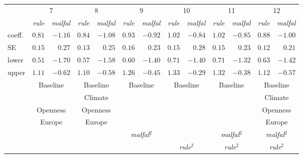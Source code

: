  \begin{tabular}{lrrrrrrrrrrrr}
\hline \hline 
& \multicolumn{2}{c}{7} & \multicolumn{2}{c}{8} & \multicolumn{2}{c}{9} & \multicolumn{2}{c}{10} & \multicolumn{2}{c}{11} & \multicolumn{2}{c}{12}\\ 
& \multicolumn{1}{c}{\emph{rule}} & \multicolumn{1}{c}{\emph{malfal}} & \multicolumn{1}{c}{\emph{rule}} & \multicolumn{1}{c}{\emph{malfal}} & \multicolumn{1}{c}{\emph{rule}} & \multicolumn{1}{c}{\emph{malfal}} & \multicolumn{1}{c}{\emph{rule}} & \multicolumn{1}{c}{\emph{malfal}} & \multicolumn{1}{c}{\emph{rule}} & \multicolumn{1}{c}{\emph{malfal}} & \multicolumn{1}{c}{\emph{rule}} & \multicolumn{1}{c}{\emph{malfal}}\\ 
 \hline 
 
coeff. & $0.81$ & $-1.16$ & $0.84$ & $-1.08$ & $0.93$ & $-0.92$ & $1.02$ & $-0.84$ & $1.02$ & $-0.85$ & $0.88$ & $-1.00$\\ 
SE & $0.15$ & $0.27$ & $0.13$ & $0.25$ & $0.16$ & $0.23$ & $0.15$ & $0.28$ & $0.15$ & $0.23$ & $0.12$ & $0.21$\\ 
lower & $0.51$ & $-1.70$ & $0.57$ & $-1.58$ & $0.60$ & $-1.40$ & $0.71$ & $-1.40$ & $0.71$ & $-1.32$ & $0.63$ & $-1.42$\\ 
upper & $1.11$ & $-0.62$ & $1.10$ & $-0.58$ & $1.26$ & $-0.45$ & $1.33$ & $-0.29$ & $1.32$ & $-0.38$ & $1.12$ & $-0.57$\\ 
& \multicolumn{2}{c}{Baseline} & \multicolumn{2}{c}{Baseline} & \multicolumn{2}{c}{Baseline} & \multicolumn{2}{c}{Baseline} & \multicolumn{2}{c}{Baseline} & \multicolumn{2}{c}{Baseline}\\ 
& \multicolumn{2}{c}{} & \multicolumn{2}{c}{Climate} & \multicolumn{2}{c}{} & \multicolumn{2}{c}{} & \multicolumn{2}{c}{} & \multicolumn{2}{c}{Climate}\\ 
& \multicolumn{2}{c}{Openness} & \multicolumn{2}{c}{Openness} & \multicolumn{2}{c}{} & \multicolumn{2}{c}{} & \multicolumn{2}{c}{} & \multicolumn{2}{c}{Openness}\\ 
& \multicolumn{2}{c}{Europe} & \multicolumn{2}{c}{Europe} & \multicolumn{2}{c}{} & \multicolumn{2}{c}{} & \multicolumn{2}{c}{} & \multicolumn{2}{c}{Europe}\\ 
& \multicolumn{2}{c}{} & \multicolumn{2}{c}{} & \multicolumn{2}{c}{\emph{malfal}$^2$} & \multicolumn{2}{c}{} & \multicolumn{2}{c}{\emph{malfal}$^2$} & \multicolumn{2}{c}{\emph{malfal}$^2$}\\ 
& \multicolumn{2}{c}{} & \multicolumn{2}{c}{} & \multicolumn{2}{c}{} & \multicolumn{2}{c}{\emph{rule}$^2$} & \multicolumn{2}{c}{\emph{rule}$^2$} & \multicolumn{2}{c}{\emph{rule}$^2$}\\ 
 \hline
\end{tabular}